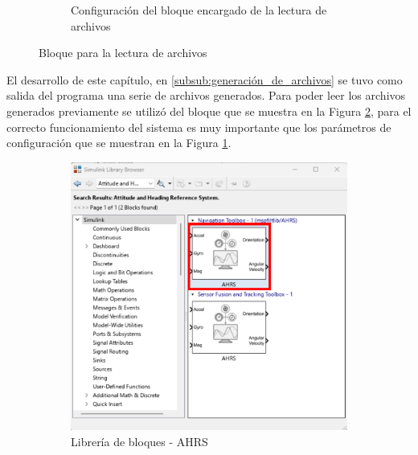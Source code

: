 \begin{figure}[htbp]
\begin{subfigure}[b]{0.45\textwidth}
        \caption{Configuración del bloque encargado de la lectura de archivos}
        \label{fig:config_from_file_IMU}
    \end{subfigure}
    \caption{Bloque para la lectura de archivos}
    \label{fig:read_from_file}
\end{figure}

El desarrollo de este capítulo, en \ref{subsub:generación_de_archivos} se tuvo como salida del programa una serie de archivos generados. Para poder leer los archivos generados previamente se utilizó del bloque que se muestra en la Figura \ref{fig:read_from_file}, para el correcto funcionamiento del sistema es muy importante que los parámetros de configuración que se muestran en la Figura \ref{fig:config_from_file_IMU}.
\newpage

\begin{figure}[htbp]
    \centering
    \begin{subfigure}[b]{0.35\textwidth}
        \centering
        \includegraphics[width=\textwidth]{fig/Capitulo5/Caso_de_estudio_IMU/Generador_de_salidas/libreira_de_bloques_sensor_AHRS.pdf}
        \caption{Librería de bloques - AHRS}
        \label{fig:lib_bloques_AHRS}
    \end{subfigure}
    \hfill
    \begin{subfigure}[b]{0.45\textwidth}
        \centering

\end{subfigure}
\end{figure}
